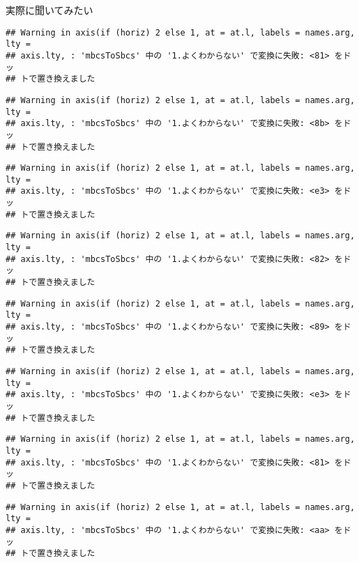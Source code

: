 \documentclass[ignorenonframetext,]{beamer}
\begin{document}
\begin{frame}[fragile]{実際に聞いてみたい}
\begin{verbatim}
## Warning in axis(if (horiz) 2 else 1, at = at.l, labels = names.arg, lty =
## axis.lty, : 'mbcsToSbcs' 中の '1.よくわからない' で変換に失敗: <81> をドッ
## トで置き換えました
\end{verbatim}

\begin{verbatim}
## Warning in axis(if (horiz) 2 else 1, at = at.l, labels = names.arg, lty =
## axis.lty, : 'mbcsToSbcs' 中の '1.よくわからない' で変換に失敗: <8b> をドッ
## トで置き換えました
\end{verbatim}

\begin{verbatim}
## Warning in axis(if (horiz) 2 else 1, at = at.l, labels = names.arg, lty =
## axis.lty, : 'mbcsToSbcs' 中の '1.よくわからない' で変換に失敗: <e3> をドッ
## トで置き換えました
\end{verbatim}

\begin{verbatim}
## Warning in axis(if (horiz) 2 else 1, at = at.l, labels = names.arg, lty =
## axis.lty, : 'mbcsToSbcs' 中の '1.よくわからない' で変換に失敗: <82> をドッ
## トで置き換えました
\end{verbatim}

\begin{verbatim}
## Warning in axis(if (horiz) 2 else 1, at = at.l, labels = names.arg, lty =
## axis.lty, : 'mbcsToSbcs' 中の '1.よくわからない' で変換に失敗: <89> をドッ
## トで置き換えました
\end{verbatim}

\begin{verbatim}
## Warning in axis(if (horiz) 2 else 1, at = at.l, labels = names.arg, lty =
## axis.lty, : 'mbcsToSbcs' 中の '1.よくわからない' で変換に失敗: <e3> をドッ
## トで置き換えました
\end{verbatim}

\begin{verbatim}
## Warning in axis(if (horiz) 2 else 1, at = at.l, labels = names.arg, lty =
## axis.lty, : 'mbcsToSbcs' 中の '1.よくわからない' で変換に失敗: <81> をドッ
## トで置き換えました
\end{verbatim}

\begin{verbatim}
## Warning in axis(if (horiz) 2 else 1, at = at.l, labels = names.arg, lty =
## axis.lty, : 'mbcsToSbcs' 中の '1.よくわからない' で変換に失敗: <aa> をドッ
## トで置き換えました
\end{verbatim}


\end{frame}
\end{document}
